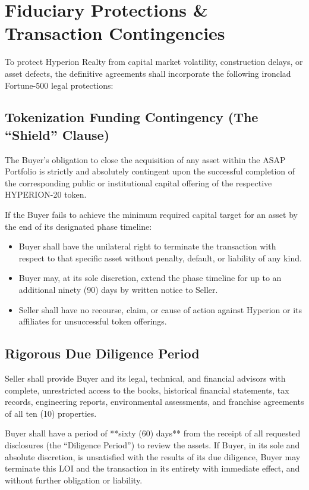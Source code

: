 \documentclass[11pt,a4paper]{article}
\begin{document}
\clearpage

\section{Fiduciary Protections \& Transaction Contingencies}
To protect Hyperion Realty from capital market volatility, construction delays, or asset defects, the definitive agreements shall incorporate the following ironclad Fortune-500 legal protections:

\subsection{Tokenization Funding Contingency (The ``Shield'' Clause)}
The Buyer’s obligation to close the acquisition of any asset within the ASAP Portfolio is strictly and absolutely contingent upon the successful completion of the corresponding public or institutional capital offering of the respective HYPERION-20 token. 
\par\vspace{5pt}
If the Buyer fails to achieve the minimum required capital target for an asset by the end of its designated phase timeline:
\begin{itemize}
    \item Buyer shall have the unilateral right to terminate the transaction with respect to that specific asset without penalty, default, or liability of any kind.
    \item Buyer may, at its sole discretion, extend the phase timeline for up to an additional ninety (90) days by written notice to Seller.
    \item Seller shall have no recourse, claim, or cause of action against Hyperion or its affiliates for unsuccessful token offerings.
\end{itemize}

\subsection{Rigorous Due Diligence Period}
Seller shall provide Buyer and its legal, technical, and financial advisors with complete, unrestricted access to the books, historical financial statements, tax records, engineering reports, environmental assessments, and franchise agreements of all ten (10) properties. 
\par\vspace{5pt}
Buyer shall have a period of **sixty (60) days** from the receipt of all requested disclosures (the ``Diligence Period'') to review the assets. If Buyer, in its sole and absolute discretion, is unsatisfied with the results of its due diligence, Buyer may terminate this LOI and the transaction in its entirety with immediate effect, and without further obligation or liability.
\end{document}
